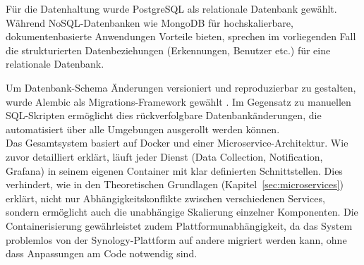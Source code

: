 Für die Datenhaltung wurde PostgreSQL als relationale Datenbank gewählt. \cite{postgresql}
Während NoSQL-Datenbanken wie MongoDB für hochskalierbare, dokumentenbasierte Anwendungen Vorteile bieten, sprechen im vorliegenden Fall die strukturierten Datenbeziehungen (Erkennungen, Benutzer etc.) für eine relationale Datenbank.

Um Datenbank-Schema Änderungen versioniert und reproduzierbar zu gestalten, wurde Alembic als Migrations-Framework gewählt \cite{alembic}.
Im Gegensatz zu manuellen SQL-Skripten ermöglicht dies rückverfolgbare Datenbankänderungen, die automatisiert über alle Umgebungen ausgerollt werden können. \\

Das Gesamtsystem basiert auf Docker und einer Microservice-Architektur.
Wie zuvor detailliert erklärt, läuft jeder Dienst (Data Collection, Notification, Grafana) in seinem eigenen Container mit klar definierten Schnittstellen.
Dies verhindert, wie in den Theoretischen Grundlagen (Kapitel~\ref{sec:microservices}) erklärt, nicht nur Abhängigkeitskonflikte zwischen verschiedenen Services, sondern ermöglicht auch die unabhängige Skalierung einzelner Komponenten.
Die Containerisierung gewährleistet zudem Plattformunabhängigkeit, da das System problemlos von der Synology-Plattform auf andere migriert werden kann, ohne dass Anpassungen am Code notwendig sind.
